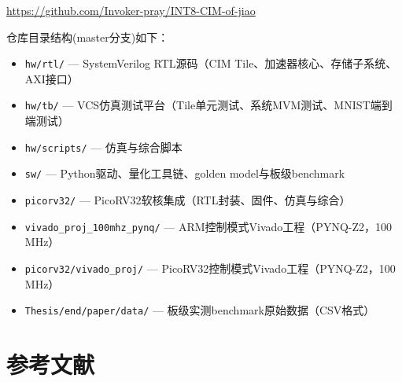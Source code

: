 \documentclass[12pt, a4paper]{article}
\begin{document}
\begin{center}
\url{https://github.com/Invoker-pray/INT8-CIM-of-jiao}
\end{center}

仓库目录结构(master分支)如下：

\begin{itemize}
\item \texttt{hw/rtl/} — SystemVerilog RTL源码（CIM Tile、加速器核心、存储子系统、AXI接口）
\item \texttt{hw/tb/} — VCS仿真测试平台（Tile单元测试、系统MVM测试、MNIST端到端测试）
\item \texttt{hw/scripts/} — 仿真与综合脚本
\item \texttt{sw/} — Python驱动、量化工具链、golden model与板级benchmark
\item \texttt{picorv32/} — PicoRV32软核集成（RTL封装、固件、仿真与综合）
\item \texttt{vivado\_proj\_100mhz\_pynq/} — ARM控制模式Vivado工程（PYNQ-Z2，100 MHz）
\item \texttt{picorv32/vivado\_proj/} — PicoRV32控制模式Vivado工程（PYNQ-Z2，100 MHz）
\item \texttt{Thesis/end/paper/data/} — 板级实测benchmark原始数据（CSV格式）
\end{itemize}
\section{参考文献}
\nocite{*}
\printbibliography[heading=none]
\end{document}
